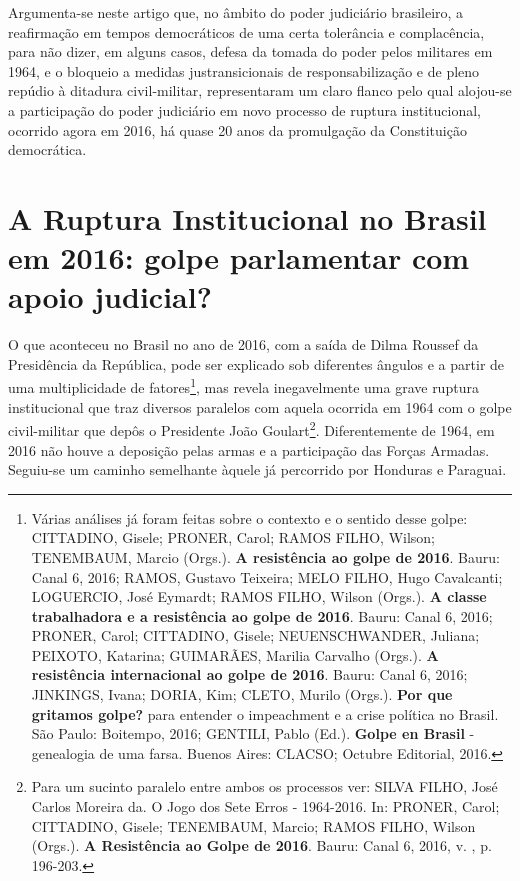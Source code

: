 Argumenta-se neste artigo que, no âmbito do poder judiciário brasileiro,
a reafirmação em tempos democráticos de uma certa tolerância e
complacência, para não dizer, em alguns casos, defesa da tomada do poder
pelos militares em 1964, e o bloqueio a medidas justransicionais de
responsabilização e de pleno repúdio à ditadura civil-militar,
representaram um claro flanco pelo qual alojou-se a participação do
poder judiciário em novo processo de ruptura institucional, ocorrido
agora em 2016, há quase 20 anos da promulgação da Constituição
democrática.

\section{A Ruptura Institucional no Brasil em 2016: golpe parlamentar
com apoio judicial?}

O que aconteceu no Brasil no ano de 2016, com a saída de Dilma Roussef
da Presidência da República, pode ser explicado sob diferentes ângulos e
a partir de uma multiplicidade de fatores\footnote{Várias análises já
  foram feitas sobre o contexto e o sentido desse golpe: CITTADINO,
  Gisele; PRONER, Carol; RAMOS FILHO, Wilson; TENEMBAUM, Marcio (Orgs.).
  \textbf{A resistência ao golpe de 2016}. Bauru: Canal 6, 2016; RAMOS,
  Gustavo Teixeira; MELO FILHO, Hugo Cavalcanti; LOGUERCIO, José
  Eymardt; RAMOS FILHO, Wilson (Orgs.). \textbf{A classe trabalhadora e
  a resistência ao golpe de 2016}. Bauru: Canal 6, 2016; PRONER, Carol;
  CITTADINO, Gisele; NEUENSCHWANDER, Juliana; PEIXOTO, Katarina;
  GUIMARÃES, Marilia Carvalho (Orgs.). \textbf{A resistência
  internacional ao golpe de 2016}. Bauru: Canal 6, 2016; JINKINGS,
  Ivana; DORIA, Kim; CLETO, Murilo (Orgs.). \textbf{Por que gritamos
  golpe?} para entender o impeachment e a crise política no Brasil. São
  Paulo: Boitempo, 2016; GENTILI, Pablo (Ed.). \textbf{Golpe en Brasil}
  - genealogia de uma farsa. Buenos Aires: CLACSO; Octubre Editorial,
  2016.}, mas revela inegavelmente uma grave ruptura institucional que
traz diversos paralelos com aquela ocorrida em 1964 com o golpe
civil-militar que depôs o Presidente João Goulart\footnote{Para um
  sucinto paralelo entre ambos os processos ver: SILVA FILHO, José
  Carlos Moreira da. O Jogo dos Sete Erros - 1964-2016. In: PRONER,
  Carol; CITTADINO, Gisele; TENEMBAUM, Marcio; RAMOS FILHO, Wilson
  (Orgs.). \textbf{A Resistência ao Golpe de 2016}. Bauru: Canal 6,
  2016, v. , p. 196-203.}. Diferentemente de 1964, em 2016 não houve a
deposição pelas armas e a participação das Forças Armadas. Seguiu-se um
caminho semelhante àquele já percorrido por Honduras e Paraguai.

